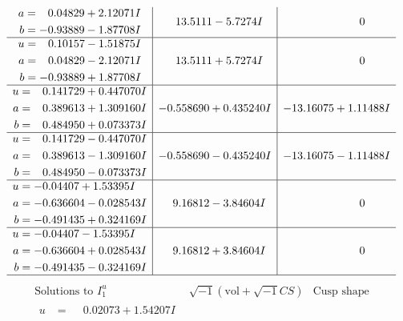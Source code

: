\documentclass[1p]{elsarticle_modified}
\theoremstyle{definition}
\newcommand{\I}{\sqrt{-1}}
\begin{document}
$$\begin{array}{c|c|c}
\begin{aligned}
a &= \phantom{-}0.04829 + 2.12071 I \\
b &= -0.93889 - 1.87708 I\end{aligned}
 & \phantom{-}13.5111 - 5.7274 I & \phantom{-0.000000 } 0 \\ \hline\begin{aligned}
u &= \phantom{-}0.10157 - 1.51875 I \\
a &= \phantom{-}0.04829 - 2.12071 I \\
b &= -0.93889 + 1.87708 I\end{aligned}
 & \phantom{-}13.5111 + 5.7274 I & \phantom{-0.000000 } 0 \\ \hline\begin{aligned}
u &= \phantom{-}0.141729 + 0.447070 I \\
a &= \phantom{-}0.389613 + 1.309160 I \\
b &= \phantom{-}0.484950 + 0.073373 I\end{aligned}
 & -0.558690 + 0.435240 I & -13.16075 + 1.11488 I \\ \hline\begin{aligned}
u &= \phantom{-}0.141729 - 0.447070 I \\
a &= \phantom{-}0.389613 - 1.309160 I \\
b &= \phantom{-}0.484950 - 0.073373 I\end{aligned}
 & -0.558690 - 0.435240 I & -13.16075 - 1.11488 I \\ \hline\begin{aligned}
u &= -0.04407 + 1.53395 I \\
a &= -0.636604 - 0.028543 I \\
b &= -0.491435 + 0.324169 I\end{aligned}
 & \phantom{-}9.16812 - 3.84604 I & \phantom{-0.000000 } 0 \\ \hline\begin{aligned}
u &= -0.04407 - 1.53395 I \\
a &= -0.636604 + 0.028543 I \\
b &= -0.491435 - 0.324169 I\end{aligned}
 & \phantom{-}9.16812 + 3.84604 I & \phantom{-0.000000 } 0\\
 \hline 
 \end{array}$$\newpage$$\begin{array}{c|c|c}  
\text{Solutions to }I^u_{1}& \I (\text{vol} + \sqrt{-1}CS) & \text{Cusp shape}\\
 \hline 
\begin{aligned}
u &= \phantom{-}0.02073 + 1.54207 I \\

\end{aligned}
\end{array}$$
\end{document}
